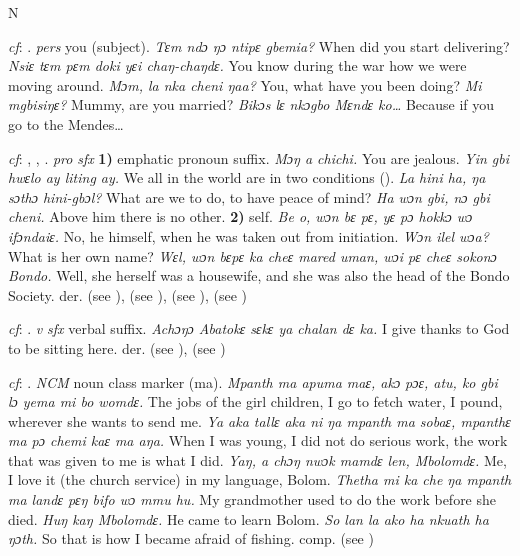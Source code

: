 \begin{letter}{N}

 \textit{cf}: . \textit{pers} you (subject). \textit{Tɛm ndɔ ŋɔ ntipɛ gbemia?} When did you start delivering? \textit{Nsiɛ tɛm pɛm doki yɛi chaŋ-chaŋdɛ.} You know during the war how we were moving around. \textit{Mɔm, la nka cheni ŋaa?} You, what have you been doing? \textit{Mi mgbisiŋɛ?} Mummy, are you married? \textit{Bikɔs lɛ nkɔgbo Mɛndɛ ko…} Because if you go to the Mendes…

 \textit{cf}: , , . \textit{pro} \textit{sfx} \textbf{1)} emphatic pronoun suffix. \textit{Mɔŋ a chichi.} You are jealous. \textit{Yin gbi hwɛlo ay liting ay.} We all in the world are in two conditions (\citealt{Pichl1967}). \textit{La hini ha, ŋa sɔthɔ hini-gbɔl?} What are we to do, to have peace of mind? \textit{Ha wɔn gbi, nɔ gbi cheni.} Above him there is no other. \textbf{2)} self. \textit{Be o, wɔn bɛ pɛ, yɛ pɔ hokkɔ wɔ ifɔndaiɛ.} No, he himself, when he was taken out from initiation. \textit{Wɔn ilel wɔa?} What is her own name? \textit{Wɛl, wɔn bɛpɛ ka cheɛ mared uman, wɔi pɛ cheɛ sokonɔ Bondo.} Well, she herself was a housewife, and she was also the head of the Bondo Society. der.  (see ),  (see ),  (see ),  (see ) 

 \textit{cf}: . \textit{v} \textit{sfx} verbal suffix. \textit{Achɔŋɔ Abatokɛ sɛkɛ ya chalan dɛ ka.} I give thanks to God to be sitting here. der.  (see ),  (see ) 

 \textit{cf}: . \textit{NCM} noun class marker (ma). \textit{Mpanth ma apuma maɛ, akɔ pɔɛ, atu, ko gbi lɔ yema mi bo womdɛ.} The jobs of the girl children, I go to fetch water, I pound, wherever she wants to send me. \textit{Ya aka tallɛ aka ni ŋa mpanth ma sobaɛ, mpanthɛ ma pɔ chemi kaɛ ma aŋa.} When I was young, I did not do serious work, the work that was given to me is what I did. \textit{Yaŋ, a chɔŋ nwɔk mamdɛ len, Mbolomdɛ.} Me, I love it (the church service) in my language, Bolom. \textit{Thetha mi ka che ŋa mpanth ma landɛ pɛŋ bifo wɔ mmu hu.} My grandmother used to do the work before she died. \textit{Huŋ kaŋ Mbolomdɛ.} He came to learn Bolom. \textit{So lan la ako ha nkuath ha ŋɔth.} So that is how I became afraid of fishing. comp.  (see ) 


\end{letter}

